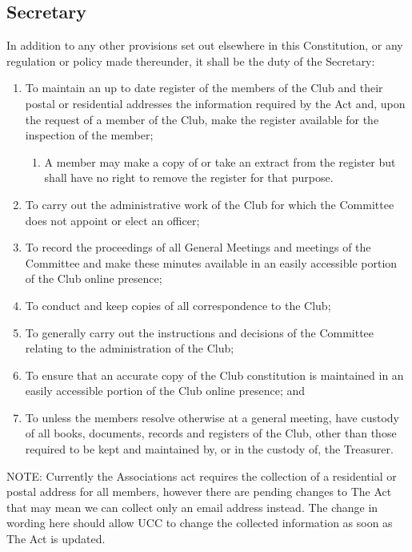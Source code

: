 \documentclass[11pt]{article} %
\begin{document}
\subsection{Secretary}
In addition to any other provisions set out elsewhere in this Constitution, or any regulation or policy made thereunder, it shall be the duty of the Secretary:
\begin{enumerate}

	\item To maintain an up to date register of the members of the Club and {\color{red}their postal or residential addresses} {\color{ForestGreen}the information required by the Act} and, upon the request of a member of the Club, make the register available for the inspection of the member;
	\begin{enumerate}[1.]
			\item A member may make a copy of or take an extract from the register but shall have no right to remove the register for that purpose.
		\end{enumerate}
	\item To carry out the administrative work of the Club for which the Committee does not appoint or elect an officer;
	\item To record the proceedings of all General Meetings and meetings of the Committee and make these minutes available in an easily accessible portion of the Club online presence;
	\item To conduct and keep copies of all correspondence to the Club;
	\item To generally carry out the instructions and decisions of the Committee relating to the administration of the Club;
	\item To ensure that an accurate copy of the Club constitution is maintained in an easily accessible portion of the Club online presence; and
	\item To unless the members resolve otherwise at a general meeting, have custody of all books, documents, records and registers of the Club, other than those required to be kept and maintained by, or in the custody of, the Treasurer.
\end{enumerate}
{\color{Cyan}NOTE:
Currently the Associations act requires the collection of a residential or postal address for all members, however there are pending changes to The Act that may mean we can collect only an email address instead.
The change in wording here should allow UCC to change the collected information as soon as The Act is updated.\\
}
\end{document}
